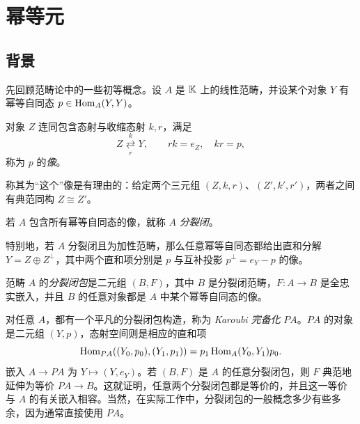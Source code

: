 \section{幂等元}\label{sec:4}
\subsection{背景}\label{sec:4a}
先回顾范畴论中的一些初等概念。设 $A$ 是 $\mathbb K$ 上的线性范畴，并设某个对象 $Y$ 有幂等自同态 $p\in\operatorname{Hom}_A(Y,Y)$。
\begin{definition*}
对象 $Z$ 连同包含态射与收缩态射 $k,r$，满足
\begin{equation}\label{eq:4.1}
Z\mathrel{\mathop{\rightleftarrows}\limits^{k}_{r}}Y,\qquad rk=e_Z,\quad kr=p,
\end{equation}
称为 $p$ 的\emph{像}。
\end{definition*}
称其为“这个”像是有理由的：给定两个三元组 $(Z,k,r)$、$(Z',k',r')$，两者之间有典范同构 $Z\cong Z'$。
\begin{definition*}
若 $A$ 包含所有幂等自同态的像，就称 $A$ \emph{分裂闭}。
\end{definition*}
特别地，若 $A$ 分裂闭且为加性范畴，那么任意幂等自同态都给出直和分解 $Y=Z\oplus Z^{\perp}$，其中两个直和项分别是 $p$ 与互补投影 $p^{\perp}=e_Y-p$ 的像。
\begin{definition*}
范畴 $A$ 的\emph{分裂闭包}是二元组 $(B,F)$，其中 $B$ 是分裂闭范畴，$F:A\to B$ 是全忠实嵌入，并且 $B$ 的任意对象都是 $A$ 中某个幂等自同态的像。
\end{definition*}
对任意 $A$，都有一个平凡的分裂闭包构造，称为 \emph{Karoubi 完备化} $PA$。$PA$ 的对象是二元组 $(Y,p)$，态射空间则是相应的直和项
\[
\operatorname{Hom}_{PA}((Y_0,p_0),(Y_1,p_1))=p_1\operatorname{Hom}_A(Y_0,Y_1)p_0.
\]
嵌入 $A\to PA$ 为 $Y\mapsto(Y,e_Y)$。若 $(B,F)$ 是 $A$ 的任意分裂闭包，则 $F$ 典范地延伸为等价 $PA\to B$。这就证明，任意两个分裂闭包都是等价的，并且这一等价与 $A$
的有关嵌入相容。当然，在实际工作中，分裂闭包的一般概念多少有些多余，因为通常直接使用 $PA$。

